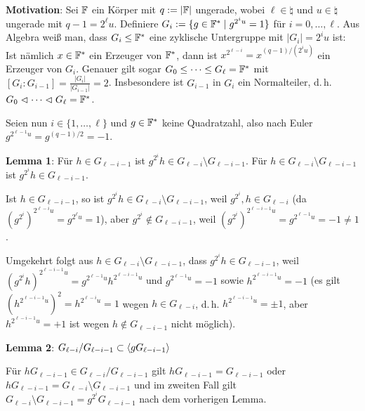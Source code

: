 \textbf{Motivation}:
Sei $\mathbb{F}$ ein Körper mit $q := |\mathbb{F}|$ ungerade,
wobei $\ell \in \natural$ und $u \in \natural$ ungerade mit $q - 1 = 2^\ell u$.
Definiere $G_i := \{g \in \mathbb{F}^\ast \;|\; g^{2^i u} = 1\}$
für $i = 0, \dotsc, \ell$.
Aus Algebra weiß man, dass $G_i \le \mathbb{F}^\ast$ eine zyklische Untergruppe
mit $|G_i| = 2^i u$ ist:
Ist nämlich $x \in \mathbb{F}^\ast$ ein Erzeuger von $\mathbb{F}^\ast$, dann ist
$x^{2^{\ell-i}} = x^{(q-1)/(2^i u)}$ ein Erzeuger von $G_i$.
Genauer gilt sogar $G_0 \le \dotsb \le G_\ell = \mathbb{F}^\ast$ mit
$[G_i : G_{i-1}] = \frac{|G_i|}{|G_{i-1}|} = 2$.
Insbesondere ist $G_{i-1}$ in $G_i$ ein Normalteiler, d.\,h.
$G_0 \vartriangleleft \dotsb \vartriangleleft G_\ell = \mathbb{F}^\ast$.

\linie

Seien nun $i \in \{1, \dotsc, \ell\}$ und
$g \in \mathbb{F}^\ast$ keine Quadratzahl, also nach Euler $g^{2^{\ell-1}u} = g^{(q-1)/2} = -1$.

\textbf{Lemma 1}:
Für $h \in G_{\ell-i-1}$ ist $g^{2^i} h \in G_{\ell-i} \setminus G_{\ell-i-1}$.
Für $h \in G_{\ell-i} \setminus G_{\ell-i-1}$ ist $g^{2^i} h \in G_{\ell-i-1}$.

\begin{Beweis}
    Ist $h \in G_{\ell-i-1}$, so ist $g^{2^i} h \in G_{\ell-i} \setminus G_{\ell-i-1}$,
    weil $g^{2^i}, h \in G_{\ell-i}$
    (da $(g^{2^i})^{2^{\ell-i} u} = g^{2^\ell u} = 1$),
    aber $g^{2^i} \notin G_{\ell-i-1}$,
    weil $(g^{2^i})^{2^{\ell-i-1} u} = g^{2^{\ell-1} u} = -1 \not= 1$.

    Umgekehrt folgt aus $h \in G_{\ell-i} \setminus G_{\ell-i-1}$,
    dass $g^{2^i} h \in G_{\ell-i-1}$,
    weil $(g^{2^i} h)^{2^{\ell-i-1} u} = g^{2^{\ell-1} u} h^{2^{\ell-i-1} u}$
    und $g^{2^{\ell-1} u} = -1$ sowie
    $h^{2^{\ell-i-1} u} = -1$ (es gilt $(h^{2^{\ell-i-1} u})^2 = h^{2^{\ell-i} u} = 1$ wegen
    $h \in G_{\ell-i}$, d.\,h. $h^{2^{\ell-i-1} u} = \pm 1$,
    aber $h^{2^{\ell-i-1} u} = +1$ ist wegen $h \notin G_{\ell-i-1}$ nicht möglich).
\end{Beweis}

\textbf{Lemma 2}:
$G_{\ell-i}/G_{\ell-i-1} \subset \langle gG_{\ell-i-1}\rangle$

\begin{Beweis}
    Für $hG_{\ell-i-1} \in G_{\ell-i}/G_{\ell-i-1}$ gilt
    $hG_{\ell-i-1} = G_{\ell-i-1}$ oder
    $hG_{\ell-i-1} = G_{\ell-i} \setminus G_{\ell-i-1}$
    und im zweiten Fall gilt $G_{\ell-i} \setminus G_{\ell-i-1} = g^{2^i} G_{\ell-i-1}$
    nach dem vorherigen Lemma.
\end{Beweis}

